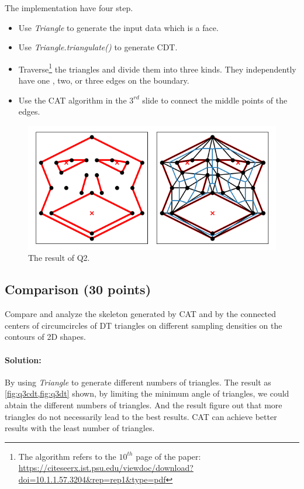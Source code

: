 \documentclass[]{article}
\begin{document}
The implementation have four step.
\begin{itemize}
    \item[(1)] Use \textit{Triangle} to generate the input data which is a face.
    \item[(2)] Use \textit{Triangle.triangulate()} to generate CDT.  
    \item[(3)] Traverse\footnote[4]{The algorithm refers to the $10^{th}$ page of the paper: \url{https://citeseerx.ist.psu.edu/viewdoc/download?doi=10.1.1.57.3204&rep=rep1&type=pdf}} the triangles and divide them into three kinds. They independently have one , two, or three edges on the boundary.
    \item[(4)] Use the CAT algorithm in the $3^{rd}$ slide to connect the middle points of the edges.
\end{itemize}
\begin{figure}[ht]
    \centering
    \includegraphics[width=\textwidth]{q2.png}
    \caption{The result of Q2.}
    \label{fig:q2}
\end{figure}


\newpage
\subsection{Comparison (30 points)}
Compare and analyze the skeleton generated by CAT and by the connected centers of circumcircles of DT triangles on different sampling densities on the contours of 2D shapes. 


\paragraph{\color{red}Solution:} 
By using \textit{Triangle} to generate different numbers of triangles.
The result as \cref{fig:q3cdt,fig:q3dt} shown, by limiting the minimum angle of triangles, we could abtain the different numbers of triangles. And the result figure out that more triangles do not necessarily lead to the best results. CAT can achieve better results with the least number of triangles.
\end{document}
